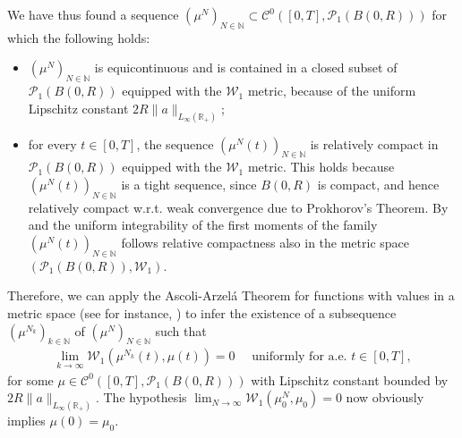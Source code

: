 \documentclass[A4paper,11pt]{article}
\theoremstyle{definition}
\newcommand{\N}{\mathbb{N}}
\newcommand{\R}{\mathbb{R}}
\newcommand{\W}{\mathcal{W}}
\begin{document}
We have thus found a sequence $(\mu^N)_{N \in \N} \subset \mathcal{C}^0([0,T],\mathcal{P}_1(B(0,R)))$ for which the following holds:
\begin{itemize}
\item $(\mu^N)_{N \in \N}$ is equicontinuous and is contained in a closed subset of $\mathcal{P}_1(B(0,R))$ equipped with the $\W_1$ metric, because of the uniform Lipschitz constant $2R\|a\|_{L_{\infty}(\R_+)}$;
\item for every $t \in [0,T]$, the sequence $(\mu^N(t))_{N \in \N}$ is relatively compact in $\mathcal{P}_1(B(0,R))$ equipped with the $\W_1$ metric. This holds because $(\mu^N(t))_{N \in \N}$ is a tight sequence, since $B(0,R)$ is compact, and hence relatively compact w.r.t. weak convergence due to Prokhorov's Theorem. By \cite[Proposition 7.1.5]{AGS} and the uniform integrability of the first moments of the family $(\mu^N(t))_{N \in \N}$ follows relative compactness also in the metric space $(\mathcal{P}_1(B(0,R)),\W_1)$.
\end{itemize}
Therefore, we can apply the Ascoli-Arzel\'{a} Theorem for functions with values in a metric space (see for instance, \cite[Chapter 7, Theorem 18]{KelleyTop}) to infer the existence of a subsequence $(\mu^{N_k})_{k \in \N}$ of $(\mu^N)_{N \in \N}$ such that
\begin{align}\label{eq:unifconv}
\lim_{k \rightarrow \infty}\W_1(\mu^{N_k}(t),\mu(t)) = 0 \quad \text{ uniformly for a.e. } t \in [0,T],
\end{align}
for some $\mu \in \mathcal{C}^0([0,T],\mathcal{P}_1(B(0,R)))$ with Lipschitz constant bounded by $2R\|a\|_{L_{\infty}(\R_+)}$. The hypothesis $\lim_{N\rightarrow\infty}\W_1(\mu^N_0,\mu_0) = 0$ now obviously implies $\mu(0) = \mu_0$.
\end{document}
